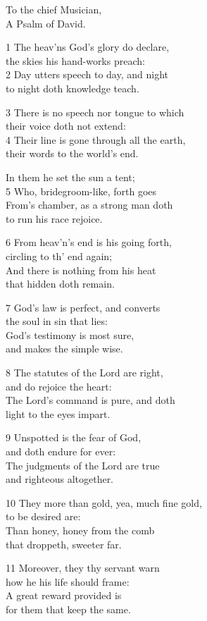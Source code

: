 To the chief Musician,\\
A Psalm of David.

1 The heav’ns God’s glory do declare,\\
the skies his hand-works preach:\\
2 Day utters speech to day, and night\\
to night doth knowledge teach.

3 There is no speech nor tongue to which\\
their voice doth not extend:\\
4 Their line is gone through all the earth,\\
their words to the world’s end.

In them he set the sun a tent;\\
5 Who, bridegroom-like, forth goes\\
From’s chamber, as a strong man doth\\
to run his race rejoice.

6 From heav’n’s end is his going forth,\\
circling to th’ end again;\\
And there is nothing from his heat\\
that hidden doth remain.

7 God’s law is perfect, and converts\\
the soul in sin that lies:\\
God’s testimony is most sure,\\
and makes the simple wise.

8 The statutes of the Lord are right,\\
and do rejoice the heart:\\
The Lord’s command is pure, and doth\\
light to the eyes impart.

9 Unspotted is the fear of God,\\
and doth endure for ever:\\
The judgments of the Lord are true\\
and righteous altogether.

10 They more than gold, yea, much fine gold,\\
to be desired are:\\
Than honey, honey from the comb\\
that droppeth, sweeter far.

11 Moreover, they thy servant warn\\
how he his life should frame:\\
A great reward provided is\\
for them that keep the same.

